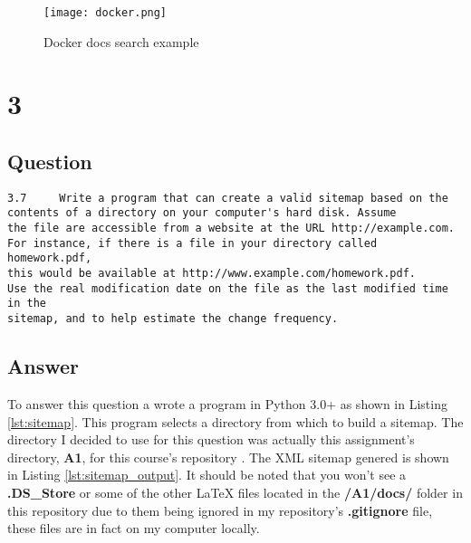 \documentclass[letterpaper,11pt]{article}
\newcommand*{\srcPath}{../src}%
\begin{document}
\begin{figure}[h]
\centering
\texttt{[image: docker.png]}
\caption{Docker docs search example}
\label{fig:docker}
\end{figure}


\clearpage


\section*{3}

\subsection*{Question}

\begin{verbatim}
3.7 	Write a program that can create a valid sitemap based on the
contents of a directory on your computer's hard disk. Assume
the file are accessible from a website at the URL http://example.com.
For instance, if there is a file in your directory called homework.pdf,
this would be available at http://www.example.com/homework.pdf.
Use the real modification date on the file as the last modified time in the
sitemap, and to help estimate the change frequency.
\end{verbatim}

\subsection*{Answer}

To answer this question a wrote a program in Python 3.0+ as shown in Listing \ref{lst:sitemap}.
This program selects a directory from which to build a sitemap.
The directory I decided to use for this question was actually this assignment's directory, \textbf{A1}, for this course's repository \cite{github}.
The XML sitemap genered is shown in Listing \ref{lst:sitemap_output}.
It should be noted that you won't see a \textbf{.DS\_Store} or some of the other LaTeX files located in the \textbf{/A1/docs/} folder in this
repository due to them being ignored in my repository's \textbf{.gitignore} file, these files are in fact on my computer locally.


 
\end{document}
